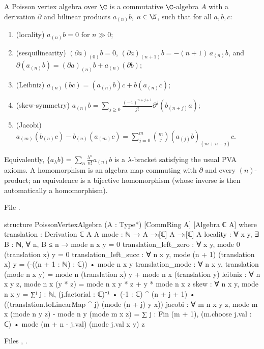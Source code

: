 \begin{definition}\label{l20:def:pva}
A Poisson vertex algebra over $\C$ is a commutative $\C$-algebra $A$ with a derivation $\partial$ and bilinear
products $a_{(n)}b$, $n\in\N$, such that for all $a,b,c$:
\begin{enumerate}
\item (locality) $a_{(n)}b=0$ for $n\gg0$;
\item (sesquilinearity) $(\partial a)_{(0)}b=0$, $(\partial a)_{(n+1)}b=-(n+1)\,a_{(n)}b$, and
  $\partial(a_{(n)}b)=(\partial a)_{(n)}b+a_{(n)}(\partial b)$;
\item (Leibniz) $a_{(n)}(bc)=(a_{(n)}b)c+b(a_{(n)}c)$;
\item (skew-symmetry) $a_{(n)}b=\sum_{j\ge0}\frac{(-1)^{n+j+1}}{j!}\partial^j(b_{(n+j)}a)$;
\item (Jacobi) $a_{(m)}(b_{(n)}c)-b_{(n)}(a_{(m)}c)=\sum_{j=0}^m\binom mj(a_{(j)}b)_{(m+n-j)}c$.
\end{enumerate}
Equivalently, $\{a_\lambda b\}=\sum_n\frac{\lambda^n}{n!}a_{(n)}b$ is a $\lambda$-bracket satisfying the usual
PVA axioms. A homomorphism is an algebra map commuting with $\partial$ and every $(n)$-product; an
equivalence is a bijective homomorphism (whose inverse is then automatically a homomorphism).
\end{definition}
\noindent File .
\begin{leancode}
structure PoissonVertexAlgebra (A : Type*) [CommRing A] [Algebra ℂ A] where
  translation : Derivation ℂ A A
  mode : ℕ → A →ₗ[ℂ] A →ₗ[ℂ] A
  locality : ∀ x y, ∃ B : ℕ, ∀ n, B ≤ n → mode n x y = 0
  translation_left_zero : ∀ x y, mode 0 (translation x) y = 0
  translation_left_succ : ∀ n x y,
    mode (n + 1) (translation x) y = (-((n + 1 : ℕ) : ℂ)) • mode n x y
  translation_mode : ∀ n x y,
    translation (mode n x y) = mode n (translation x) y + mode n x (translation y)
  leibniz : ∀ n x y z, mode n x (y * z) = mode n x y * z + y * mode n x z
  skew : ∀ n x y, mode n x y = ∑ᶠ j : ℕ,
    (j.factorial : ℂ)⁻¹ • (-1 : ℂ) ^ (n + j + 1) •
      ((translation.toLinearMap ^ j) (mode (n + j) y x))
  jacobi : ∀ m n x y z,
    mode m x (mode n y z) - mode n y (mode m x z) =
      ∑ j : Fin (m + 1), (m.choose j.val : ℂ) • mode (m + n - j.val) (mode j.val x y) z
\end{leancode}
\noindent Files ,
.
